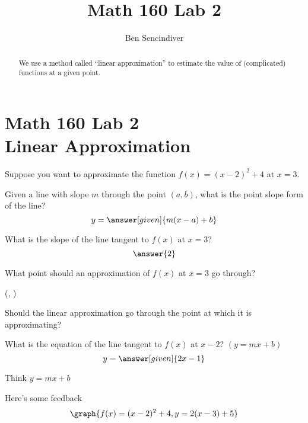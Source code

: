 \documentclass[handout,nooutcomes]{ximera}
\title{Math 160 Lab 2}
\author{Ben Sencindiver} %
\begin{document}
\section{Math 160 Lab 2 \\ Linear Approximation}

\begin{abstract}
We use a method called ``linear approximation'' to estimate the value
of (complicated) functions at a given point.
\end{abstract}

\maketitle


Suppose you want to approximate the function $f(x) = (x-2)^2  + 4$ at $x=3$.

Given a line with slope $m$ through the point $(a, b)$, what is the point slope form of the line?
\[
y = \answer[given]{m(x - a) + b}
\]

What is the slope of the line tangent to $f(x)$ at $x=3$?
\[
\answer{2}
\]

What point should an approximation of $f(x)$ at $x=3$ go through?

\begin{prompt}
(, )
\end{prompt}

\begin{hint}
Should the linear approximation go through the point at which it is approximating?
\end{hint}


\begin{problem}
What is the equation of the line tangent to $f(x)$ at $x-2$? $(y=mx+b)$
\[
y = \answer[given]{2x-1}
\]

\begin{hint}
Think $y=mx+b$
\end{hint}

\begin{feedback}
Here's some feedback
\[
\graph{f(x) = (x-2)^2+4, y = 2(x-3) + 5}
\]
\end{feedback}
\end{problem}




\end{document}
